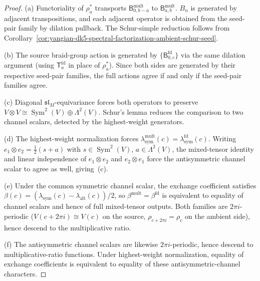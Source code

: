 \begin{proof}
\textup{(a)}
Functoriality of \(\rho_a^*\) transports
\(\mathsf B_{0,b-a}^{\mathrm{mult}}\) to
\(\mathsf B_{a,b}^{\mathrm{mult}}\).
\(B_n\) is generated by adjacent transpositions, and each adjacent
operator is obtained from the seed-pair family by dilation pullback.
The Schur-simple reduction follows from
Corollary~\ref{cor:yangian-dk5-spectral-factorization-ambient-schur-seed}.

\textup{(b)}
The source braid-group action is generated by
\(\{\mathsf B_{0,c}^{\mathrm{fd}}\}\) via the same dilation argument
(using \(\mathsf T_a^{\mathrm{fd}}\) in place of \(\rho_a^*\)).
Since both sides are generated by their respective seed-pair families,
the full actions agree if and only if the seed-pair families agree.

\textup{(c)}
Diagonal \(\mathfrak{sl}_M\)-equivariance forces both operators to
preserve
\(V\otimes V\cong \operatorname{Sym}^2(V)\oplus \Lambda^2(V)\).
Schur's lemma reduces the comparison to two channel scalars, detected
by the highest-weight generators.

\textup{(d)}
The highest-weight normalization forces
\(\lambda_{\mathrm{sym}}^{\mathrm{mult}}(c)=
\lambda_{\mathrm{sym}}^{\mathrm{fd}}(c)\).
Writing \(e_1\otimes e_2=\frac12(s+a)\) with
\(s\in\operatorname{Sym}^2(V)\), \(a\in\Lambda^2(V)\), the
mixed-tensor identity and linear independence of \(e_1\otimes e_2\)
and \(e_2\otimes e_1\) force the antisymmetric channel scalar to
agree as well, giving~\textup{(c)}.

\textup{(e)}
Under the common symmetric channel scalar, the exchange coefficient
satisfies
\(\beta(c)=(\lambda_{\mathrm{sym}}(c)-\lambda_{\mathrm{alt}}(c))/2\),
so \(\beta^{\mathrm{mult}}=\beta^{\mathrm{fd}}\) is equivalent to
equality of channel scalars and hence of full mixed-tensor outputs.
Both families are \(2\pi i\)-periodic (\(V(c+2\pi i)\cong V(c)\) on
the source, \(\rho_{c+2\pi i}=\rho_c\) on the ambient side), hence
descend to the multiplicative ratio.

\textup{(f)}
The antisymmetric channel scalars are likewise \(2\pi i\)-periodic,
hence descend to multiplicative-ratio functions.  Under highest-weight
normalization, equality of exchange coefficients is equivalent to
equality of these antisymmetric-channel characters.
\end{proof}

